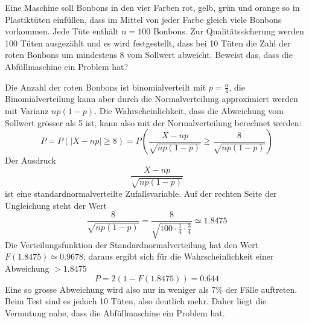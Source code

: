 Eine Maschine soll Bonbons in den vier Farben rot, gelb, grün
und orange so in
Plastiktüten einfüllen, dass im Mittel von jeder Farbe gleich
viele Bonbons vorkommen. Jede Tüte enthält $n=100$ Bonbons.
Zur Qualitätssicherung werden 100 Tüten ausgezählt und
es wird festgestellt, dass bei 10 Tüten die Zahl der roten
Bonbons um mindestens 8 vom Sollwert abweicht. Beweist das,
dass die Abfüllmaschine ein Problem hat?


\begin{loesung}
Die Anzahl der roten Bonbons ist binomialverteilt mit $p=\frac{n}4$,
die Binomialverteilung
kann aber durch die Normalverteilung approximiert werden mit
Varianz $np(1-p)$. Die Wahrscheinlichkeit, dass die Abweichung vom
Sollwert grösser als 5 ist, kann also mit der Normalverteilung
berechnet werden:
\[
P = P\left(\left|X-np\right|\ge 8\right)
=P\left(
\frac{X-np}{\sqrt{np(1-p)}}\ge \frac{8}{\sqrt{np(1-p)}}
\right)
\]
Der Ausdruck
\[
\frac{X-np}{\sqrt{np(1-p)}}
\]
ist eine standardnormalverteilte Zufallsvariable. Auf der
rechten Seite der Ungleichung steht der Wert
\[
\frac{8}{\sqrt{np(1-p)}}
=\frac{8}{\sqrt{100\cdot\frac14\cdot\frac34}}\simeq 1.8475
\]
Die Verteilungsfunktion der Standardnormalverteilung hat den
Wert $F(1.8475)\simeq0.9678$, daraus ergibt sich für die
Wahrscheinlichkeit einer Abweichung $>1.8475$
\[
P=2(1-F(1.8475))=0.644
\]
Eine so grosse Abweichung wird also nur in weniger als 7\%
der Fälle auftreten. Beim Test sind es jedoch 10 Tüten,
also deutlich mehr. Daher liegt die Vermutung nahe, dass
die Abfüllmaschine ein Problem hat.
\end{loesung}

